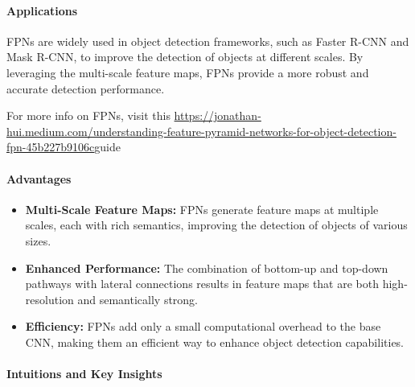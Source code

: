 \documentclass[12pt]{article}
\begin{document}
\paragraph{Applications}

FPNs are widely used in object detection frameworks, such as Faster R-CNN and Mask R-CNN, to improve the detection of objects at different scales. By leveraging the multi-scale feature maps, FPNs provide a more robust and accurate detection performance.

For more info on FPNs, visit this \href{this guide}{https://jonathan-hui.medium.com/understanding-feature-pyramid-networks-for-object-detection-fpn-45b227b9106c}guide

\paragraph{Advantages}

\begin{itemize}
    \item \textbf{Multi-Scale Feature Maps:} FPNs generate feature maps at multiple scales, each with rich semantics, improving the detection of objects of various sizes.
    \item \textbf{Enhanced Performance:} The combination of bottom-up and top-down pathways with lateral connections results in feature maps that are both high-resolution and semantically strong.
    \item \textbf{Efficiency:} FPNs add only a small computational overhead to the base CNN, making them an efficient way to enhance object detection capabilities.
\end{itemize}

\paragraph{Intuitions and Key Insights}
\end{document}

